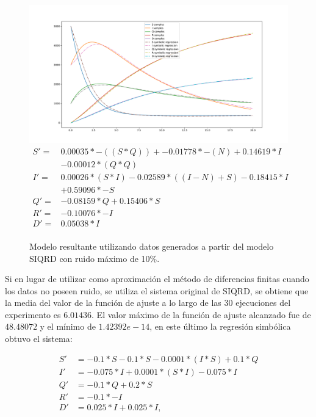 \begin{figure}[h]
    \centering
    \includegraphics[width=\textwidth]{"figures/final_plot_SIQRD_0.1.pdf"}
    \begin{align*}
        S' = & 0.00035 * -((S * Q)) + -0.01778 * -(N) + 0.14619 * I    \\
             & -0.00012 * (Q * Q)                                      \\
        I' = & 0.00026 * (S * I) -0.02589 * ((I - N) + S) -0.18415 * I \\
             & + 0.59096 * -S                                          \\
        Q' = & -0.08159 * Q + 0.15406 * S                              \\
        R' = & -0.10076 * -I                                           \\
        D' = & 0.05038 * I                                             \\
    \end{align*}
    \caption{Modelo resultante utilizando datos generados a partir del modelo SIQRD con ruido máximo de 10\%.}
    \label{fig:final_plot_SIQRD_0.1}
\end{figure}

Si en lugar de utilizar como aproximación el método de diferencias finitas cuando los datos no poseen ruido, se utiliza el sistema original de SIQRD, se obtiene que la media del valor de la función de ajuste a lo largo de las 30 ejecuciones del experimento es $6.01436$. El valor máximo de la función de ajuste alcanzado fue de $48.48072$ y el mínimo de $1.42392e-14$, en este último la regresión simbólica obtuvo el sistema:

\begin{align*}
    S' & = -0.1 * S -0.1 * S -0.0001 * (I * S) + 0.1 * Q \\
    I' & = -0.075 * I + 0.0001 * (S * I) -0.075 * I      \\
    Q' & = -0.1 * Q + 0.2 * S                            \\
    R' & = -0.1 * -I                                     \\
    D' & = 0.025 * I + 0.025 * I,
\end{align*}

